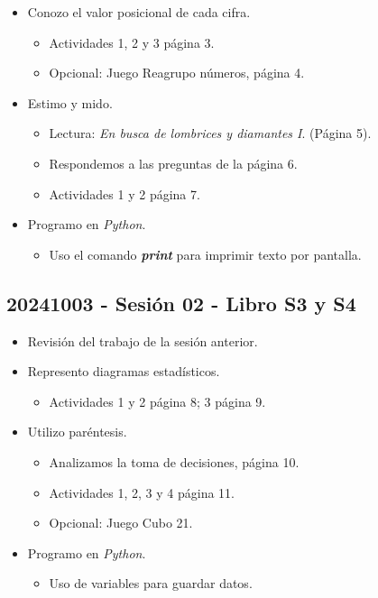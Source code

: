 \documentclass[a4paper,12pt]{article}
\begin{document}
\begin{itemize}
    \item Conozo el valor posicional de cada cifra.
    \begin{itemize}
        \item Actividades 1, 2 y 3 página 3.
        \item Opcional: Juego Reagrupo números, página 4.
    \end{itemize}
    \item Estimo y mido.
    \begin{itemize}
        \item Lectura: \textit{En busca de lombrices y diamantes I}. (Página 5).
        \item Respondemos a las preguntas de la página 6.
        \item Actividades 1 y 2 página 7.
    \end{itemize}
    \item Programo en \textit{Python}.
    \begin{itemize}
        \item Uso el comando \textbf{\textit{print}} para imprimir texto por pantalla.
    \end{itemize}
\end{itemize}

\subsection{20241003 - Sesión 02 - Libro S3 y S4}

\begin{itemize}
    \item Revisión del trabajo de la sesión anterior.
    \item Represento diagramas estadísticos.
    \begin{itemize}
        \item Actividades 1 y 2 página 8; 3 página 9.
    \end{itemize}
    \item Utilizo paréntesis.
    \begin{itemize}
        \item Analizamos la toma de decisiones, página 10.
        \item Actividades 1, 2, 3 y 4 página 11.
        \item Opcional: Juego Cubo 21.
    \end{itemize}
    \item Programo en \textit{Python}.
    \begin{itemize}
        \item Uso de variables para guardar datos.
    \end{itemize}
\end{itemize}
\end{document}
